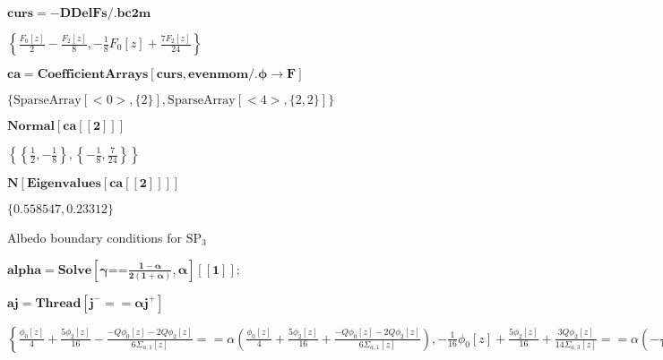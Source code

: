 \documentclass{article}
\begin{document}
\begin{doublespace}
\noindent\(\pmb{\text{curs} = -\text{DDelFs}\text{/.}\text{bc2m}}\)
\end{doublespace}

\begin{doublespace}
\noindent\(\left\{\frac{F_0[z]}{2}-\frac{F_2[z]}{8},-\frac{1}{8} F_0[z]+\frac{7 F_2[z]}{24}\right\}\)
\end{doublespace}

\begin{doublespace}
\noindent\(\pmb{\text{ca}=\text{CoefficientArrays}[\text{curs},\text{evenmom}\text{/.}\phi \to F]}\)
\end{doublespace}

\begin{doublespace}
\noindent\(\{\text{SparseArray}[<0>,\{2\}],\text{SparseArray}[<4>,\{2,2\}]\}\)
\end{doublespace}

\begin{doublespace}
\noindent\(\pmb{\text{Normal}[\text{ca}[[2]]]}\)
\end{doublespace}

\begin{doublespace}
\noindent\(\left\{\left\{\frac{1}{2},-\frac{1}{8}\right\},\left\{-\frac{1}{8},\frac{7}{24}\right\}\right\}\)
\end{doublespace}

\begin{doublespace}
\noindent\(\pmb{N[\text{Eigenvalues}[\text{ca}[[2]]]]}\)
\end{doublespace}

\begin{doublespace}
\noindent\(\{0.558547,0.23312\}\)
\end{doublespace}

Albedo boundary conditions for \(\text{SP}_3\)

\begin{doublespace}
\noindent\(\pmb{\text{alpha}=\text{Solve}\left[\gamma \text{==} \frac{1-\alpha }{2(1+\alpha )},\alpha \right][[1]];}\)
\end{doublespace}

\begin{doublespace}
\noindent\(\pmb{\text{aj}=\text{Thread}\left[j^-==\alpha  j^+\right]}\)
\end{doublespace}

\begin{doublespace}
\noindent\(\left\{\frac{\phi _0[z]}{4}+\frac{5 \phi _2[z]}{16}-\frac{-Q \phi _0[z]-2 Q \phi _2[z]}{6 \Sigma _{a,1}[z]}==\alpha  \left(\frac{\phi
_0[z]}{4}+\frac{5 \phi _2[z]}{16}+\frac{-Q \phi _0[z]-2 Q \phi _2[z]}{6 \Sigma _{a,1}[z]}\right),-\frac{1}{16} \phi _0[z]+\frac{5 \phi _2[z]}{16}+\frac{3
Q \phi _2[z]}{14 \Sigma _{a,3}[z]}==\alpha  \left(-\frac{1}{16} \phi _0[z]+\frac{5 \phi _2[z]}{16}-\frac{3 Q \phi _2[z]}{14 \Sigma _{a,3}[z]}\right)\right\}\)
\end{doublespace}
\end{document}
